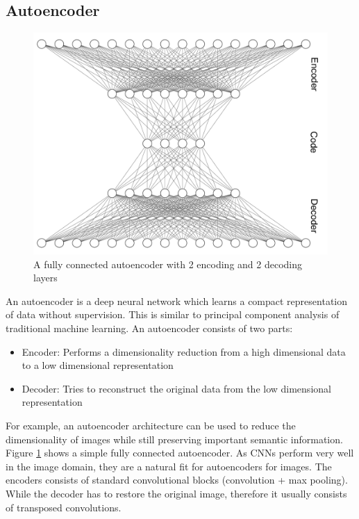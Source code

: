 \documentclass[draft,final,oneside]{vutinfth} %
\begin{document}
\subsection{Autoencoder}

\begin{figure}[ht]
	\centering
  	\includegraphics[width=1.0\textwidth]{graphics/autoencoder.png}
	\caption{A fully connected autoencoder with 2 encoding and 2 decoding layers}
	\label{fig:autoencoder}
\end{figure}

An autoencoder is a deep neural network which learns a compact representation of data without supervision. This is similar to principal component analysis of traditional machine learning. An autoencoder consists of two parts: 

\begin{itemize}
\item Encoder: Performs a dimensionality reduction from a high dimensional data to a low dimensional representation
\item Decoder: Tries to reconstruct the original data from the low dimensional representation
\end{itemize}

For example, an autoencoder architecture can be used to reduce the dimensionality of images while still preserving important semantic information. Figure \ref{fig:autoencoder} shows a simple fully connected autoencoder. As CNNs perform very well in the image domain, they are a natural fit for autoencoders for images. The encoders consists of standard convolutional blocks (convolution + max pooling). While the decoder has to restore the original image, therefore it usually consists of transposed convolutions.
\end{document}
